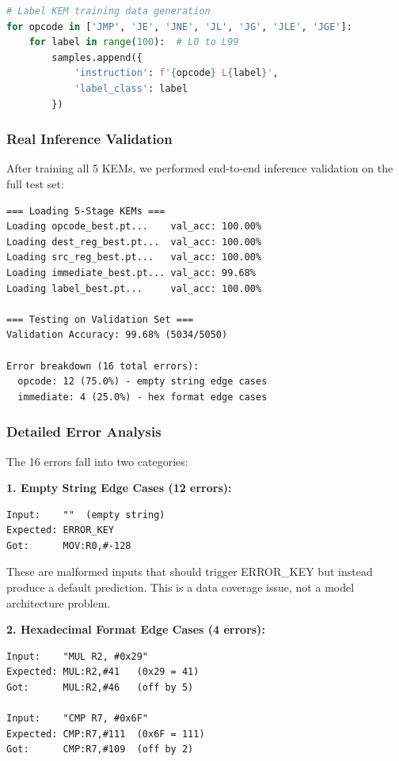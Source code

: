 \documentclass[11pt]{article}
\begin{document}
\begin{lstlisting}[language=Python]
# Label KEM training data generation
for opcode in ['JMP', 'JE', 'JNE', 'JL', 'JG', 'JLE', 'JGE']:
    for label in range(100):  # L0 to L99
        samples.append({
            'instruction': f'{opcode} L{label}',
            'label_class': label
        })
\end{lstlisting}

\subsubsection{Real Inference Validation}

After training all 5 KEMs, we performed end-to-end inference validation on the full test set:

\begin{lstlisting}
=== Loading 5-Stage KEMs ===
Loading opcode_best.pt...    val_acc: 100.00%
Loading dest_reg_best.pt...  val_acc: 100.00%
Loading src_reg_best.pt...   val_acc: 100.00%
Loading immediate_best.pt... val_acc: 99.68%
Loading label_best.pt...     val_acc: 100.00%

=== Testing on Validation Set ===
Validation Accuracy: 99.68% (5034/5050)

Error breakdown (16 total errors):
  opcode: 12 (75.0%) - empty string edge cases
  immediate: 4 (25.0%) - hex format edge cases
\end{lstlisting}

\subsubsection{Detailed Error Analysis}

The 16 errors fall into two categories:

\textbf{1. Empty String Edge Cases (12 errors):}
\begin{lstlisting}
Input:    ""  (empty string)
Expected: ERROR_KEY
Got:      MOV:R0,#-128
\end{lstlisting}

These are malformed inputs that should trigger ERROR\_KEY but instead produce a default prediction. This is a data coverage issue, not a model architecture problem.

\textbf{2. Hexadecimal Format Edge Cases (4 errors):}
\begin{lstlisting}
Input:    "MUL R2, #0x29"
Expected: MUL:R2,#41   (0x29 = 41)
Got:      MUL:R2,#46   (off by 5)

Input:    "CMP R7, #0x6F"
Expected: CMP:R7,#111  (0x6F = 111)
Got:      CMP:R7,#109  (off by 2)
\end{lstlisting}
\end{document}
